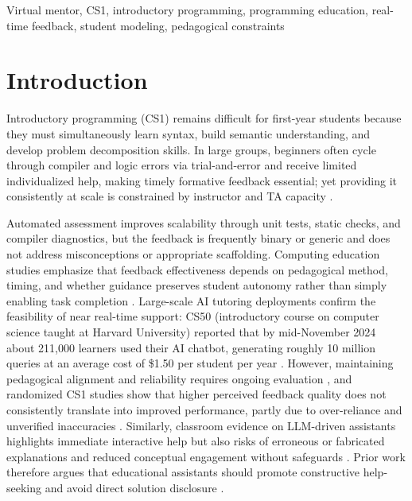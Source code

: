 \documentclass[conference]{IEEEtran}
\begin{document}
\begin{IEEEkeywords}
Virtual mentor, CS1, introductory programming, programming education, real-time feedback, student modeling, pedagogical constraints
\end{IEEEkeywords}


\section{Introduction}

Introductory programming (CS1) remains difficult for first-year students because they must simultaneously learn syntax, build semantic understanding, and develop problem decomposition skills. In large groups, beginners often cycle through compiler and logic errors via trial-and-error and receive limited individualized help, making timely formative feedback essential; yet providing it consistently at scale is constrained by instructor and TA capacity \cite{DesirableCharacteristicsforAITeachingAssistantsinProgrammingEducation,FeasibilityStudyofAugmentingTeachingAssistantswithAI}.

Automated assessment improves scalability through unit tests, static checks, and compiler diagnostics, but the feedback is frequently binary or generic and does not address misconceptions or appropriate scaffolding. Computing education studies emphasize that feedback effectiveness depends on pedagogical method, timing, and whether guidance preserves student autonomy rather than simply enabling task completion \cite{SystematicLiteratureReviewonLLM,DesirableCharacteristicsforAITeachingAssistantsinProgrammingEducation}. Large-scale AI tutoring deployments confirm the feasibility of near real-time support: CS50 (introductory course on computer science taught at Harvard University) reported that by mid-November 2024 about 211{,}000 learners used their AI chatbot, generating roughly 10 million queries at an average cost of \$1.50 per student per year \cite{ImprovingAIinCS50}. However, maintaining pedagogical alignment and reliability requires ongoing evaluation \cite{ImprovingAIinCS50}, and randomized CS1 studies show that higher perceived feedback quality does not consistently translate into improved performance, partly due to over-reliance and unverified inaccuracies \cite{FeasibilityStudyofAugmentingTeachingAssistantswithAI}. Similarly, classroom evidence on LLM-driven assistants highlights immediate interactive help but also risks of erroneous or fabricated explanations and reduced conceptual engagement without safeguards \cite{SystematicLiteratureReviewonLLM,PatternsofLLMPoweredProgrammingAssistant}. Prior work therefore argues that educational assistants should promote constructive help-seeking and avoid direct solution disclosure \cite{CodeAid,IRIS,DesirableCharacteristicsforAITeachingAssistantsinProgrammingEducation}.
\end{document}
